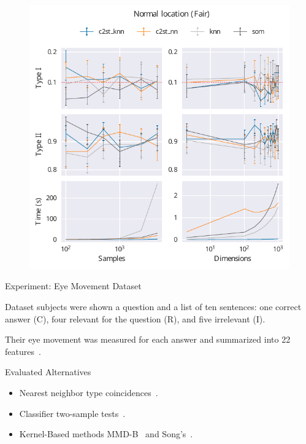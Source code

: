 \documentclass[10pt,notes]{beamer}
\begin{document}
\begin{frame}{}
\begin{figure}
    \centering
    \includegraphics[height=\textheight]{normal_location_fair}
\end{figure}
\end{frame}

\begin{frame}{Experiment: Eye Movement Dataset}
    \begin{block}{Dataset}
         subjects were shown a question and a list of ten 
        sentences: one correct answer (C), four relevant for the question (R), and five irrelevant (I).
        
        Their eye movement was measured for each answer and summarized into 22 features~\cite{salojarvi2005inferring}.
    \end{block}
    \begin{block}{Evaluated Alternatives}
        \smallskip
        \begin{itemize}
            \item Nearest neighbor type coincidences~\cite{Henze1988, Schilling1986b}.
            \item Classifier two-sample tests~\cite{lopez2016revisiting}.
            \item Kernel-Based methods MMD-B~\cite{zaremba2013b} and Song's~\cite{song2021fast}.
        \end{itemize}
    \end{block}
\end{frame}
\end{document}
